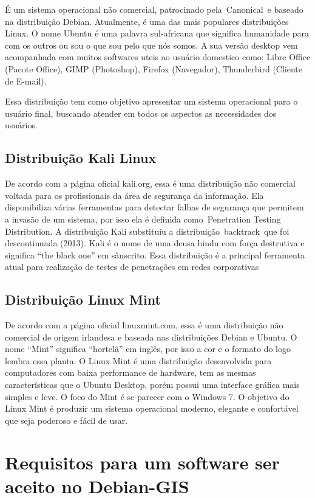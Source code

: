 É um sistema operacional não comercial, patrocinado pela Canonical e baseado na distribuição Debian. Atualmente, é uma das mais populares distribuições Linux. O nome Ubuntu é uma palavra sul-africana que significa humanidade para com os outros ou sou o que sou pelo que nós somos. A sua versão desktop vem acompanhada com muitos softwares uteis ao usuário domestico como: Libre Office (Pacote Office), GIMP (Photoshop), Firefox (Navegador), Thunderbird (Cliente de E-mail).

Essa distribuição tem como objetivo apresentar um sistema operacional para o usuário final, buscando atender em todos os aspectos as necessidades dos usuários.

\subsection{Distribuição Kali Linux}

De acordo com a página oficial kali.org, essa é uma distribuição não comercial voltada para os profissionais da área de segurança da informação. Ela disponibiliza várias ferramentas para detectar falhas de segurança que permitem a invasão de um sistema, por isso ela é definida como Penetration Testing Distribution. A distribuição Kali substituiu a distribuição backtrack que foi descontinuada (2013). Kali é o nome de uma deusa hindu com força destrutiva e significa “the black one” em sânscrito. Essa distribuição é a principal ferramenta atual para realização de testes de penetrações em redes corporativas

\subsection{Distribuição Linux Mint}

De acordo com a página oficial linuxmint.com, essa é uma distribuição não comercial de origem irlandesa e baseada nas distribuições Debian e Ubuntu. O nome “Mint” significa “hortelã” em inglês, por isso a cor e o formato do logo lembra essa planta. O Linux Mint é uma distribuição desenvolvida para computadores com baixa performance de hardware, tem as mesmas características que o Ubuntu Desktop, porém possui uma interface gráfica mais simples e leve. O foco do Mint é se parecer com o Windows 7. O objetivo do Linux Mint é produzir um sistema operacional moderno, elegante e confortável que seja poderoso e fácil de usar.

\section{Requisitos para um software ser aceito no Debian-GIS}

